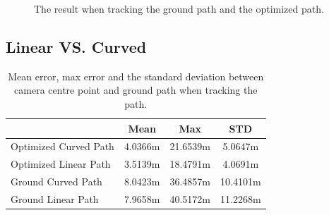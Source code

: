 \begin{figure}
	\caption{The result when tracking the ground path and the optimized path.}
	\label{fig:cur_sim_res}
\end{figure}



\subsection{Linear VS. Curved}

\begin{table}[h]
\centering
\begin{tabular}{l c c c}
    \hline
    & Mean & Max  & STD \\
    \hline
    Optimized Curved Path & 4.0366m & 21.6539m & 5.0647m  \\
    Optimized Linear Path & 3.5139m & 18.4791m & 4.0691m  \\
    Ground Curved Path    & 8.0423m & 36.4857m & 10.4101m \\
    Ground Linear Path    & 7.9658m & 40.5172m & 11.2268m \\
    \hline
\end{tabular}
\caption{Mean error, max error and the standard deviation between camera centre point and ground path when tracking the path.}
\label{tab:sim_easy}
\end{table}

